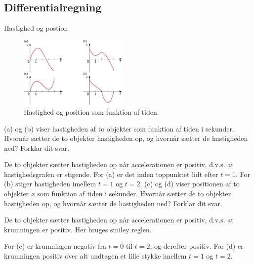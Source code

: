 \subsection*{Differentialregning}
\begin{opgave}{Hastighed og postion}
	\begin{figure}[]
		\centering
		\includegraphics[width=0.47\textwidth]{Matematik/matfig/vx_grafer.eps}
		\caption{Hastighed og position som funktion af tiden.}
		\label{fig:vx_grafer_facit}
	\end{figure}
	\opg {} (a) og (b) viser hastigheden af to objekter som funktion af tiden i sekunder. Hvornår sætter de to objekter hastigheden op, og hvornår sætter de hastigheden ned? Forklar dit svar.
	
	De to objekter sætter hastigheden op når accelerationen er positiv, d.v.s. at hastighedsgrafen er stigende.
	For (a) er det inden toppunktet lidt efter $t=1$.
	For (b) stiger hastigheden imellem $t=1$ og $t=2$.
	\opg {} (c) og (d) viser positionen af to objekter $x$ som funktion af tiden i sekunder. Hvornår sætter de to objekter hastigheden op, og hvornår sætter de hastigheden ned? Forklar dit svar.
	
	De to objekter sætter hastigheden op når accelerationen er positiv, d.v.s. at krumningen er positiv. Her bruges smiley reglen.
	
	For (c) er krumningen negativ fra $t=0$ til $t=2$, og derefter positiv.
	For (d) er krumningen positiv over alt undtagen et lille stykke imellem $t=1$ og $t=2$.
\end{opgave}

